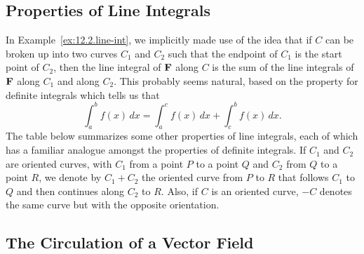 \subsection*{Properties of Line Integrals}

In Example~\ref{ex:12.2.line-int}, we implicitly made use of the idea
that if $C$ can be broken up into two curves $C_1$ and $C_2$ such that
the endpoint of $C_1$ is the start point of $C_2$, then the line
integral of $\mathbf{F}$ along $C$ is the sum of the line integrals of $\mathbf{F}$
along $C_1$ and along $C_2$. This probably seems natural, based on the
property for definite integrals which tells us that
\[\int_a^b f(x)\, dx = \int_a^c f(x)\, dx + \int_c^b f(x)\, dx.\]
The table below summarizes some other properties of line integrals,
each of which has a familiar analogue amongst the properties of
definite integrals. If $C_1$ and $C_2$ are oriented curves, with $C_1$
from a point $P$ to a point $Q$ and $C_2$ from $Q$ to a point $R$, we
denote by $C_1+C_2$ the oriented curve from $P$ to $R$ that follows
$C_1$ to $Q$ and then continues along $C_2$ to $R$. Also, if $C$ is an
oriented curve, $-C$ denotes the same curve but with the opposite
orientation.


\vspace*{5pt}
\nin 
{}
\vspace*{5pt}



\subsection*{The Circulation of a Vector Field}

